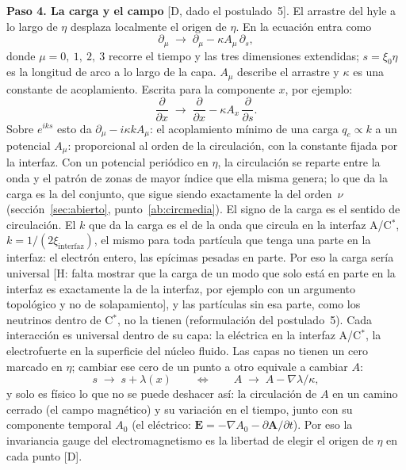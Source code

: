 \documentclass[11pt,a4paper]{article}
\newcommand{\st}[1]{\textup{[#1]}}
\newcommand{\Cst}{C\ensuremath{^{*}}}
\newcommand{\vb}[1]{\symbf{#1}}
\begin{document}
\textbf{Paso 4. La carga y el campo} \st{D, dado el postulado~5}. El arrastre del hyle a lo largo de $\eta$ desplaza localmente el origen de $\eta$. En la ecuación entra como
\begin{equation}
\partial_\mu\;\longrightarrow\;\partial_\mu-\kappa A_\mu\,\partial_s ,
\label{eq:arrastre}
\end{equation}
donde $\mu=0,\ 1,\ 2,\ 3$ recorre el tiempo y las tres dimensiones extendidas; $s=\xi_0\eta$ es la longitud de arco a lo largo de la capa. $A_\mu$ describe el arrastre y $\kappa$ es una constante de acoplamiento. Escrita para la componente $x$, por ejemplo:
\[
\frac{\partial}{\partial x}\;\longrightarrow\;\frac{\partial}{\partial x}-\kappa A_x\,\frac{\partial}{\partial s} .
\]
Sobre $e^{iks}$ esto da $\partial_\mu-i\kappa kA_\mu$: el acoplamiento mínimo de una carga $q_e\propto k$ a un potencial $A_\mu$: proporcional al orden de la circulación, con la constante fijada por la interfaz. Con un potencial periódico en $\eta$, la circulación se reparte entre la onda y el patrón de zonas de mayor índice que ella misma genera; lo que da la carga es la del conjunto, que sigue siendo exactamente la del orden~$\nu$ (sección~\ref{sec:abierto}, punto~\ref{ab:circmedia}). El signo de la carga es el sentido de circulación. El $k$ que da la carga es el de la onda que circula en la interfaz A/\Cst, $k=1/(2\xi_{\mathrm{interfaz}})$, el mismo para toda partícula que tenga una parte en la interfaz: el electrón entero, las epícimas pesadas en parte. Por eso la carga sería universal \st{H: falta mostrar que la carga de un modo que solo está en parte en la interfaz es exactamente la de la interfaz, por ejemplo con un argumento topológico y no de solapamiento}, y las partículas sin esa parte, como los neutrinos dentro de \Cst, no la tienen (reformulación del postulado~5). Cada interacción es universal dentro de su capa: la eléctrica en la interfaz A/\Cst, la electrofuerte en la superficie del núcleo fluido. Las capas no tienen un cero marcado en $\eta$; cambiar ese cero de un punto a otro equivale a cambiar $A$:
\begin{equation}
s\;\longrightarrow\;s+\lambda(x)
\qquad\Longleftrightarrow\qquad
A\;\longrightarrow\;A-\nabla\lambda/\kappa ,
\label{eq:gauge}
\end{equation}
y solo es físico lo que no se puede deshacer así: la circulación de $A$ en un camino cerrado (el campo magnético) y su variación en el tiempo, junto con su componente temporal $A_0$ (el eléctrico: $\vb{E}=-\nabla A_0-\partial\vb{A}/\partial t$). Por eso la invariancia gauge del electromagnetismo es la libertad de elegir el origen de $\eta$ en cada punto \st{D}.
\end{document}
